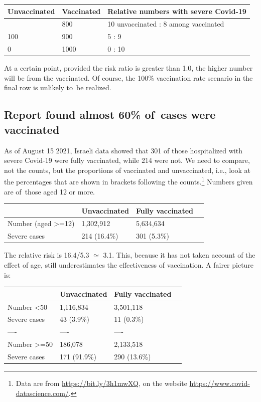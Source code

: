 \documentclass[
  10pt,
  b5paper]{book}
\begin{document}
\begin{longtable}[]{@{}lll@{}}
\toprule\noalign{}
Unvaccinated & Vaccinated & Relative numbers with severe Covid-19 \\
\midrule\noalign{}
\endhead
\bottomrule\noalign{}
\endlastfoot
200 & 800 & 10 unvaccinated : 8 among vaccinated \\
100 & 900 & 5 : 9 \\
0 & 1000 & 0 : 10 \\
\end{longtable}

At a certain point, provided the risk ratio is greater than 1.0,
the higher number will be from the vaccinated. Of course,
the 100\% vaccination rate scenario in the final row is unlikely
to~be realized.

\hypertarget{report-found-almost-60-of-cases-were-vaccinated}{%
\subsection*{Report found almost 60\% of~cases were vaccinated}\label{report-found-almost-60-of-cases-were-vaccinated}}

As of August 15 2021, Israeli data showed that 301 of those hospitalized with severe Covid-19 were fully vaccinated, while 214 were not.
We need to compare, not the counts, but the proportions of
vaccinated and unvaccinated, i.e., look at the percentages that are
shown in brackets following the counts.\footnote{Data are from
  \url{https://bit.ly/3h1mwXQ}, on the website \url{https://www.covid-datascience.com/}.}
Numbers given are of~those aged 12 or more.

\begin{longtable}[]{@{}llll@{}}
\toprule\noalign{}
& Unvaccinated & Fully vaccinated & \\
\midrule\noalign{}
\endhead
\bottomrule\noalign{}
\endlastfoot
Number (aged \textgreater=12) & 1,302,912 & 5,634,634 & \\
Severe cases & 214 (16.4\%) & 301 (5.3\%) & \\
\end{longtable}

The relative risk is 16.4/5.3 \(\simeq\) 3.1.
This, because it has not taken account of the effect of age,
still underestimates the effectiveness of vaccination. A fairer
picture is:

\begin{longtable}[]{@{}llll@{}}
\toprule\noalign{}
& Unvaccinated & Fully vaccinated & \\
\midrule\noalign{}
\endhead
\bottomrule\noalign{}
\endlastfoot
Number \textless50 & 1,116,834 & 3,501,118 & \\
Severe cases & 43 (3.9\%) & 11 (0.3\%) & \\
---- & ---- & ---- & \\
Number \textgreater=50 & 186,078 & 2,133,518 & \\
Severe cases & 171 (91.9\%) & 290 (13.6\%) & \\
\end{longtable}
\end{document}
